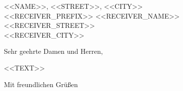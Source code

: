 \documentclass[11pt,a4paper]{dinbrief}
\begin{document}
\begin{letter}{\tiny{<<NAME>>, <<STREET>>, <<CITY>>}\\ 
<<RECEIVER_PREFIX>>
<<RECEIVER_NAME>>\\
<<RECEIVER_STREET>>\\
<<RECEIVER_CITY>>\\[6pt]
}

\subject{\textbf{<<BETREFF>>}}

\opening{Sehr geehrte Damen und Herren,}

<<TEXT>>

\closing{Mit freundlichen Grüßen}

\end{letter}
\end{document}
